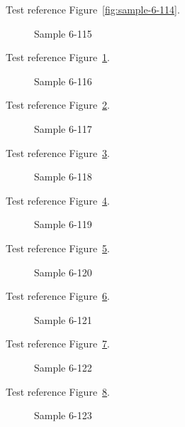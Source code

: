 Test reference Figure~\ref{fig:sample-6-114}.

\begin{figure}[tbhp]
\caption{Sample 6-115}
\label{fig:sample-6-115}
\end{figure}

Test reference Figure~\ref{fig:sample-6-115}.

\begin{figure}[tbhp]
\caption{Sample 6-116}
\label{fig:sample-6-116}
\end{figure}

Test reference Figure~\ref{fig:sample-6-116}.

\begin{figure}[tbhp]
\caption{Sample 6-117}
\label{fig:sample-6-117}
\end{figure}

Test reference Figure~\ref{fig:sample-6-117}.

\begin{figure}[tbhp]
\caption{Sample 6-118}
\label{fig:sample-6-118}
\end{figure}

Test reference Figure~\ref{fig:sample-6-118}.

\begin{figure}[tbhp]
\caption{Sample 6-119}
\label{fig:sample-6-119}
\end{figure}

Test reference Figure~\ref{fig:sample-6-119}.

\begin{figure}[tbhp]
\caption{Sample 6-120}
\label{fig:sample-6-120}
\end{figure}

Test reference Figure~\ref{fig:sample-6-120}.

\begin{figure}[tbhp]
\caption{Sample 6-121}
\label{fig:sample-6-121}
\end{figure}

Test reference Figure~\ref{fig:sample-6-121}.

\begin{figure}[tbhp]
\caption{Sample 6-122}
\label{fig:sample-6-122}
\end{figure}

Test reference Figure~\ref{fig:sample-6-122}.

\begin{figure}[tbhp]
\caption{Sample 6-123}
\label{fig:sample-6-123}
\end{figure}

